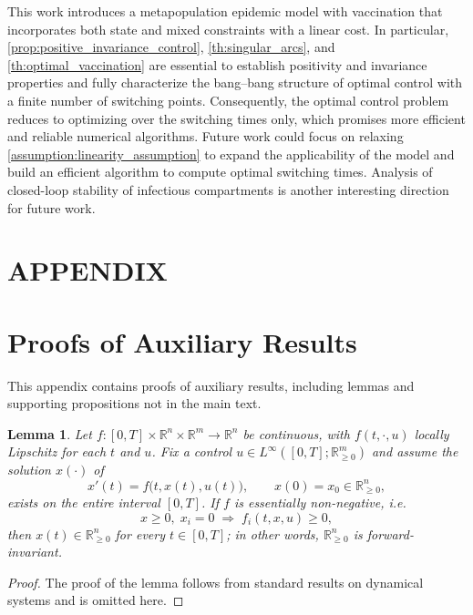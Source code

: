 \documentclass[letterpaper, 10 pt, conference]{ieeeconf}
\newcommand{\R}{\mathbb{R}}
\newtheorem{lemma}{Lemma}
\begin{document}
This work introduces a metapopulation epidemic model with vaccination that incorporates both state and mixed constraints with a linear cost.
In particular, \autoref{prop:positive_invariance_control}, \autoref{th:singular_arcs}, and \autoref{th:optimal_vaccination} are essential to establish positivity and invariance properties and fully characterize the bang--bang structure of optimal control with a finite number of switching points.
Consequently, the optimal control problem reduces to optimizing over the switching times only, which promises more efficient and reliable numerical algorithms.
Future work could focus on relaxing \autoref{assumption:linearity_assumption} to expand the applicability of the model and build an efficient algorithm to compute optimal switching times.
Analysis of closed-loop stability of infectious compartments is another interesting direction for future work.

\section*{APPENDIX}

\section*{Proofs of Auxiliary Results}
\label{sec:appendixProofs}

This appendix contains proofs of auxiliary results, including lemmas and supporting propositions not in the main text. 

\begin{lemma}
\label{lemma:positivity}
    Let $ f:[0,T] \times \mathbb{R}^n \times \mathbb{R}^m \to \mathbb{R}^n $ be continuous, with $ f(t,\cdot,u) $ locally Lipschitz for each $ t $ and $ u $.
    Fix a control \(u\in L^{\infty}([0,T];\R^{m}_{\ge0})\) and assume the solution \(x(\cdot)\) of
    \[
    x'(t)=f\bigl(t,x(t),u(t)\bigr),\qquad x(0)=x_{0}\in\R^{n}_{\ge0},
    \]
    exists on the entire interval \([0,T]\).
    If \(f\) is \emph{essentially non-negative}, i.e.
    \[
    x\ge0,\;x_{i}=0\;\Longrightarrow\;f_{i}(t,x,u)\ge0,
    \]
    then \(x(t)\in\R^{n}_{\ge0}\) for every \(t\in[0,T]\); in other words, \(\R^{n}_{\ge0}\) is forward-invariant.
\end{lemma}

\begin{proof}
    The proof of the lemma follows from standard results on dynamical systems and is omitted here.
\end{proof}
\end{document}

